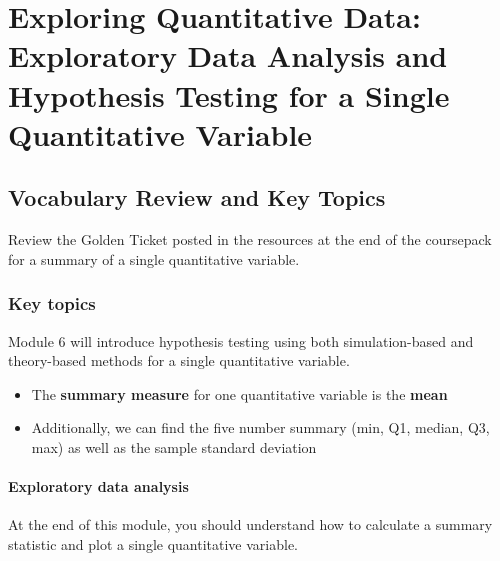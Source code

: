 \documentclass[
]{report}
\begin{document}
\nocite{*}

\chapter{Exploring Quantitative Data: Exploratory Data Analysis and Hypothesis Testing for a Single Quantitative Variable}\label{exploring-quantitative-data-exploratory-data-analysis-and-hypothesis-testing-for-a-single-quantitative-variable}

\section{Vocabulary Review and Key Topics}\label{vocabulary-review-and-key-topics}

Review the Golden Ticket posted in the resources at the end of the coursepack for a summary of a single quantitative variable.

\subsection{Key topics}\label{key-topics}

Module 6 will introduce hypothesis testing using both simulation-based and theory-based methods for a single quantitative variable.

\begin{itemize}
\item
  The \textbf{summary measure} for one quantitative variable is the \textbf{mean}
\item
  Additionally, we can find the five number summary (min, Q1, median, Q3, max) as well as the sample standard deviation
\end{itemize}

\subsubsection*{Exploratory data analysis}\label{exploratory-data-analysis}

At the end of this module, you should understand how to calculate a summary statistic and plot a single quantitative variable.
\end{document}
